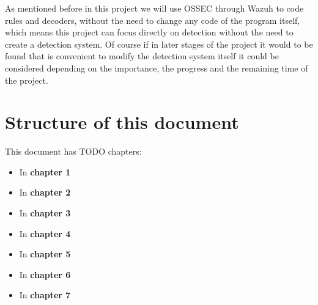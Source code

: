 \linej
As mentioned before in this project we will use OSSEC through Wazuh to code rules and decoders, without the need to change any code of the program itself, which means this project can focus directly on detection without the need to create a detection system. Of course if in later stages of the project it would to be found that is convenient to modify the detection system itself it could be considered depending on the importance, the progress and the remaining time of the project.


\section{Structure of this document}
This document has TODO chapters:
\begin{itemize}
	\item In \textbf{chapter 1} 
	\item In \textbf{chapter 2} 
	\item In \textbf{chapter 3} 
	\item In \textbf{chapter 4} 
	\item In \textbf{chapter 5} 
	\item In \textbf{chapter 6} 
	\item In \textbf{chapter 7} 
\end{itemize}
